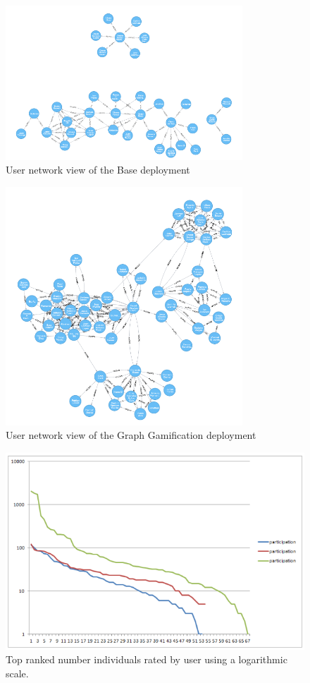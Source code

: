 \documentclass[conference]{IEEEtran}
\begin{document}
\begin{figure}[!t]
    \centering
        \includegraphics[width=3.5in]{img/user_known_2.png}
    \caption{User network view of the Base deployment}
    \label{fig:B-network}
\end{figure}
\begin{figure}[!t]
    \centering
        \includegraphics[width=3.5in]{img/user_known_3.png}
    \caption{User network view of the Graph Gamification deployment}
    \label{fig:GG-network}
\end{figure}
\begin{figure}[!t]
    \centering
        \includegraphics[width=5.5in]{img/comparison.png}
    \caption{Top ranked number individuals rated by user using a
     logarithmic scale.}
    \label{fig:top-ranked-participation}
\end{figure}
\end{document}
